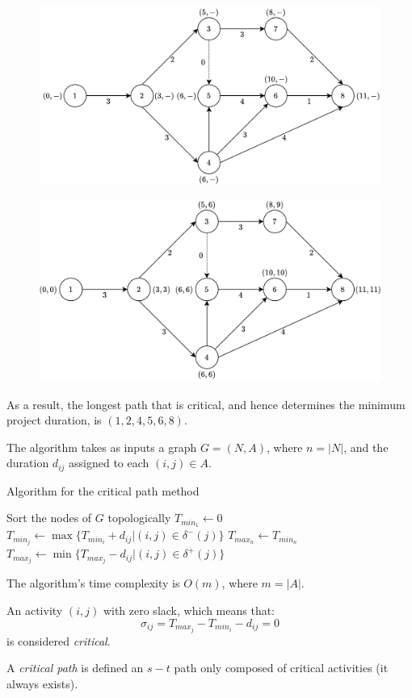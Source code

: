 \begin{example}
\begin{figure}[H]
        \centering
        \includegraphics[width=0.75\linewidth]{images/aproject.png}
    \end{figure}
    \begin{figure}[H]
        \centering
        \includegraphics[width=0.75\linewidth]{images/aproject1.png}
    \end{figure}
    As a result, the longest path that is critical, and hence determines the minimum project duration, is $(1,2,4,5,6,8)$.
\end{example}
The algorithm takes as inputs a graph $G = (N,A)$, where $n= \left\lvert N \right\rvert $, and the duration $d_{ij}$ assigned to each $(i,j) \in A$. 
\begin{algorithm}[H]
    \caption{Algorithm for the critical path method}
        \begin{algorithmic}[1]
            \State Sort the nodes of $G$ topologically
            \State $T_{min_1} \leftarrow 0$
                \State $T_{min_j} \leftarrow \max\{T_{min_i}+d_{ij}|(i,j) \in \delta^{-}(j)\}$
            \EndFor
            \State $T_{max_n} \leftarrow T_{min_n}$
            \State $T_{max_j} \leftarrow \min\{T_{max_j}-d_{ij}|(i,j) \in \delta^{+}(j)\}$
            \EndFor
        \end{algorithmic}
\end{algorithm}
The algorithm's time complexity is $O(m)$, where $m =\left\lvert A\right\rvert$. 
\begin{definition}
    An activity $(i,j)$ with zero slack, which means that:
    \[\sigma_{ij}=T_{max_j}-T_{min_i}-d_{ij}=0\]
    is considered \emph{critical}. 

    A \emph{critical path} is defined an $s-t$ path only composed of critical activities (it always exists).
\end{definition}

